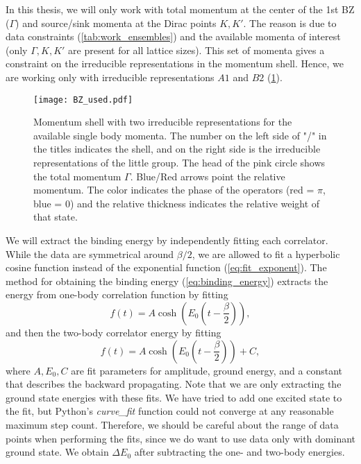 In this thesis, we will only work with total momentum at the center of the 1st BZ ($\Gamma$) and source/sink momenta at the Dirac points $K, K'$. The reason is due to data constraints (\cref{tab:work_ensembles}) and the available momenta of interest (only $\Gamma, K, K'$ are present for all lattice sizes). This set of momenta gives a constraint on the irreducible representations in the momentum shell. Hence, we are working only with irreducible representations $A1$ and $B2$ (\cref{fig:used_irrep}).
\begin{figure}[!htbp]
  \centerline{\texttt{[image: BZ\_used.pdf]}}
  \caption{Momentum shell with two irreducible representations for the available single body momenta. The number on the left side of "/" in the titles indicates the shell, and on the right side is the irreducible representations of the little group. The head of the pink circle shows the total momentum $\Gamma$. Blue/Red arrows point the relative momentum. The color indicates the phase of the operators (red = $\pi$, blue = 0) and the relative thickness indicates the relative weight of that state.}
  \label{fig:used_irrep}
\end{figure}

We will extract the binding energy by independently fitting each correlator. While the data are symmetrical around $\beta/2$, we are allowed to fit a hyperbolic cosine function instead of the exponential function (\cref{eq:fit_exponent}). The method for obtaining the binding energy (\cref{eq:binding_energy}) extracts the energy from one-body correlation function by fitting
\begin{equation}
    f(t) = A\cosh\left(E_0\left(t-\frac{\beta}{2}\right)\right),
    \label{eq:cosh1}
\end{equation}
and then the two-body correlator energy by fitting
\begin{equation}
  f(t) = A\cosh\left(E_0\left(t-\frac{\beta}{2}\right)\right) + C,
    \label{eq:cosh2}
\end{equation}
where $A, E_0, C$ are fit parameters for amplitude, ground energy, and a constant that describes the backward propagating. Note that we are only extracting the ground state energies with these fits. We have tried to add one excited state to the fit, but Python's \textit{curve\_fit} function could not converge at any reasonable maximum step count. Therefore, we should be careful about the range of data points when performing the fits, since we do want to use data only with dominant ground state. We obtain $\Delta E_0$ after subtracting the one- and two-body energies.

